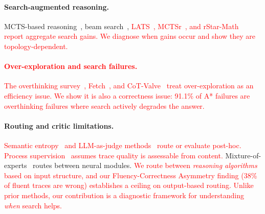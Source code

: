 \documentclass[11pt]{article}
\begin{document}
\paragraph{Search-augmented reasoning.}
MCTS-based reasoning~\cite{hao2023reasoning}, beam search~\cite{xie2024self}, \textcolor{red}{LATS~\cite{zhou2024lats}, MCTSr~\cite{zhang2024mctsrmath}, and rStar-Math~\cite{guan2025rstar} report aggregate search gains. We diagnose when gains occur and show they are topology-dependent.}

\textcolor{red}{\paragraph{Over-exploration and search failures.}
The overthinking survey~\cite{sui2025overthinking}, Fetch~\cite{wang2025fetch}, and CoT-Valve~\cite{ma2025cotvalve} treat over-exploration as an efficiency issue. We show it is also a correctness issue: 91.1\% of A* failures are overthinking failures where search actively degrades the answer.}

\paragraph{Routing and critic limitations.}
\textcolor{red}{Semantic entropy~\cite{kossen2024semanticentropyprobesrobust} and LLM-as-judge methods~\cite{zheng2023judging} route or evaluate post-hoc. Process supervision~\cite{lightman2023let} assumes trace quality is assessable from content.} Mixture-of-experts~\cite{shazeer2017outrageouslylargeneuralnetworks} routes between neural modules. \textcolor{red}{We route between \emph{reasoning algorithms} based on input structure, and our Fluency-Correctness Asymmetry finding (38\% of fluent traces are wrong) establishes a ceiling on output-based routing. Unlike prior methods, our contribution is a diagnostic framework for understanding \emph{when} search helps.}
\end{document}
